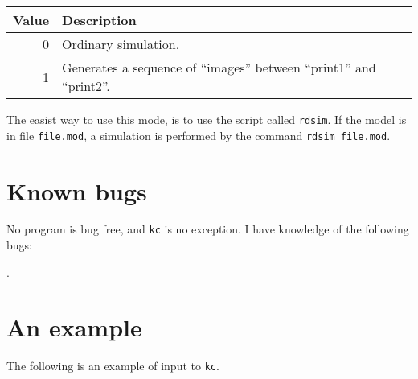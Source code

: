 \begin{center}
\begin{tabular}{rl}
\hline
Value   & Description \\ \hline
0       & Ordinary simulation. \\
1       & Generates a sequence of ``images'' between ``print1'' and
``print2''. \\
\hline
\end{tabular}
\end{center}

The easist way to use this mode, is to use the script called
{\tt rdsim}. If the model is in file {\tt file.mod}, a simulation is
performed by the command {\tt rdsim file.mod}.

\newpage
\section{Known bugs}
No program is bug free, and {\tt kc} is no exception. I have knowledge
of the following bugs:

\begin{enumerate}
\end{enumerate}
 
\newpage.   
\section{An example}
The following is an example of input to {\tt kc}.

